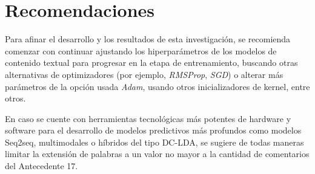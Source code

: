 \section{Recomendaciones}
Para afinar el desarrollo y los resultados de esta investigación, se recomienda comenzar con continuar ajustando los hiperparámetros de los modelos de contenido textual para progresar en la etapa de entrenamiento, buscando otras alternativas de optimizadores (por ejemplo, \textit{RMSProp}, \textit{SGD}) o alterar más parámetros de la opción usada \textit{Adam}, usando otros inicializadores de kernel, entre otros.

En caso se cuente con herramientas tecnológicas más potentes de hardware y software para el desarrollo de modelos predictivos más profundos como modelos Seq2seq, multimodales o híbridos del tipo DC-LDA, se sugiere de todas maneras limitar la extensión de palabras a un valor no mayor a la cantidad de comentarios del Antecedente 17.